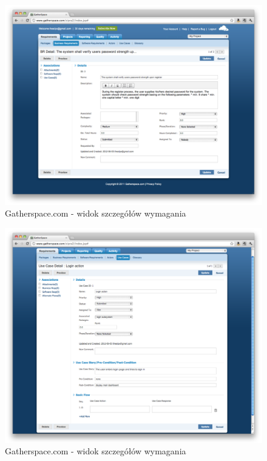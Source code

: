         \begin{figure}[t]
          \centering
          \includegraphics[width=1.0\textwidth]{img/gatherspace_7.pdf}
          \caption{Gatherspace.com - widok szczegółów wymagania}
          \label{fig:gatherspace_7}
        \end{figure}

        \begin{figure}[t]
          \centering
          \includegraphics[width=1.0\textwidth]{img/gatherspace_8.pdf}
          \caption{Gatherspace.com - widok szczegółów wymagania}
          \label{fig:gatherspace_8}
        \end{figure}

